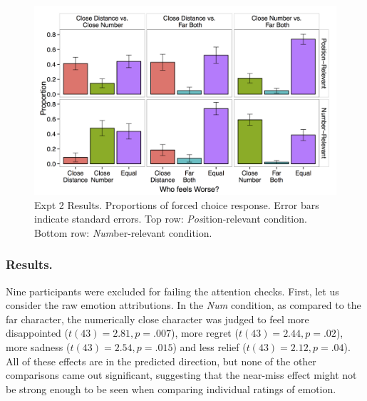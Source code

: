 \documentclass[10pt,letterpaper]{article}
\begin{document}



\begin{figure}[htb!]
\includegraphics[width=\columnwidth]{images/cardCombined_forcedWorse.png}
\caption{ Expt 2 Results. Proportions of forced choice response. Error bars indicate standard errors. Top row: \textit{Pos}ition-relevant condition. Bottom row: \textit{Num}ber-relevant condition.}
\label{Expt2ResultFig}
\end{figure}

\subsubsection{Results.} Nine participants were excluded for failing the attention checks.
First, let us consider the raw emotion attributions. In the \textit{Num} condition, as compared to the far character, the numerically close character was judged to feel more disappointed ($t(43)=2.81, p=.007$), more regret ($t(43)=2.44, p=.02$), more sadness ($t(43)=2.54, p=.015$) and less relief ($t(43)=2.12, p=.04$). All of these effects are in the predicted direction, but none of the other comparisons came out significant, suggesting that the near-miss effect might not be strong enough to be seen when comparing individual ratings of emotion.
\end{document}
